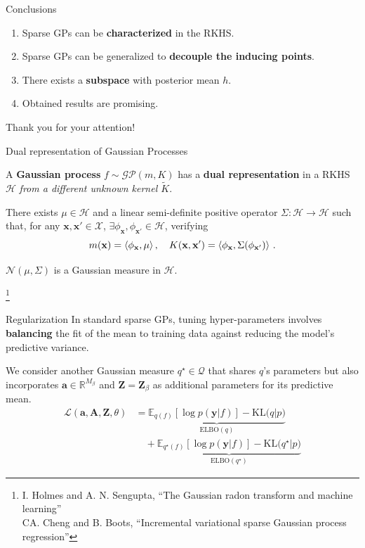 \documentclass[aspectratio=149]{beamer}
\begin{document}
    \begin{frame}{Conclusions}
        \begin{enumerate}[<+->]
            \item Sparse GPs can be \textbf{characterized} in the RKHS.
            \item Sparse GPs can be generalized to \textbf{decouple the inducing points}.
            \item There exists a \textbf{subspace} with posterior mean \(h\).
            \item Obtained results are promising.
        \end{enumerate}
    \end{frame}

    \begin{frame}[standout]
        Thank you for your attention!
    \end{frame}
    \begin{frame}{Dual representation of Gaussian Processes}

        A \textbf{Gaussian process} \(f\sim \mathcal{GP}(m, K)\) has a \textbf{\color{orange}dual representation} in a RKHS \(\mathcal{H}\) \emph{from a {\color{orange}different unknown} kernel \(\tilde{K}\)}.
        
        There exists \(\mu \in \mathcal{H}\) and a linear semi-definite positive operator \(\Sigma:\mathcal{H} \to \mathcal{H}\) such that, for any \(\mathbf{x}, \mathbf{x}' \in \mathcal{X}\), \(\exists \phi_{\mathbf{x}}, \phi_{\mathbf{x}'}\in \mathcal{H}\), verifying
        \[
            m(\mathbf{x}) = \braket{\phi_{\mathbf{x}}, \mu}, \quad K(\mathbf{x}, \mathbf{x}') = \braket{\phi_{\mathbf{x}}, \Sigma(\phi_{\mathbf{x}'})}\,.
        \]
        \begin{center}
        \(\mathcal{N}(\mu, \Sigma)\) is a Gaussian measure in \(\mathcal{H}\).
        \end{center}
    {\let\thefootnote\relax\footnote{{I. Holmes and A. N. Sengupta, ``The Gaussian radon transform and machine learning''\\CA. Cheng and B. Boots, ``Incremental variational sparse Gaussian process regression''}}}
    \end{frame}
    \begin{frame}{Regularization}
         In standard sparse GPs, tuning hyper-parameters involves \textbf{balancing} the fit of the mean to training data against reducing the model's predictive variance. 

         
        We consider another Gaussian measure \(q^\star \in \mathcal{Q}\) that shares \(q\)'s parameters but also incorporates \(\bm{a} \in \mathbb{R}^{M_\beta}\) and \(\mathbf{Z} = \mathbf{Z}_\beta\) as additional parameters for its predictive mean.
         \[
            \begin{aligned}
            \mathcal{L}(\bm{a}, \bm{A}, \mathbf{Z}, \theta) &= \underbrace{\mathbb{E}_{q(f)}[\log p(\mathbf{y}|f)] - \text{KL}\big(q \big| p\big)}_{\text{ELBO}(q)} \\
            &\quad + \underbrace{\mathbb{E}_{q^\star(f)}[\log p(\mathbf{y}|f)] - \text{KL}\big(q^\star \big| p\big)}_{\text{ELBO}(q^\star)}
            \end{aligned}
            \]
    \end{frame}
\end{document}
